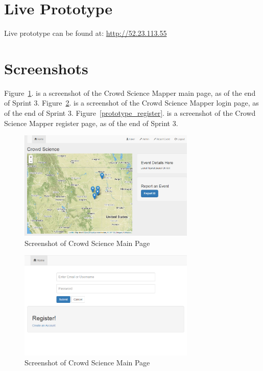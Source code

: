 
\section{Live Prototype}
Live prototype can be found at: \url{http://52.23.113.55}

\section{Screenshots}
Figure~\ref{prototype_main}. is a screenshot of the Crowd Science Mapper main page, as of the end of Sprint 3.  Figure~\ref{prototype_login}. is a screenshot of the Crowd Science Mapper login page, as of the end of Sprint 3. Figure~\ref{prototype_register}. is a screenshot of the Crowd Science Mapper register page, as of the end of Sprint 3.

\begin{figure}[tbh]
\begin{center}
\includegraphics[width=0.75\textwidth]{./Images/prototype_main.png}
\end{center}
\caption{Screenshot of Crowd Science Main Page\label{prototype_main}}
\end{figure}

\begin{figure}[tbh]
\begin{center}
\includegraphics[width=0.75\textwidth]{./Images/prototype_login.png}
\end{center}
\caption{Screenshot of Crowd Science Main Page\label{prototype_login}}
\end{figure}

